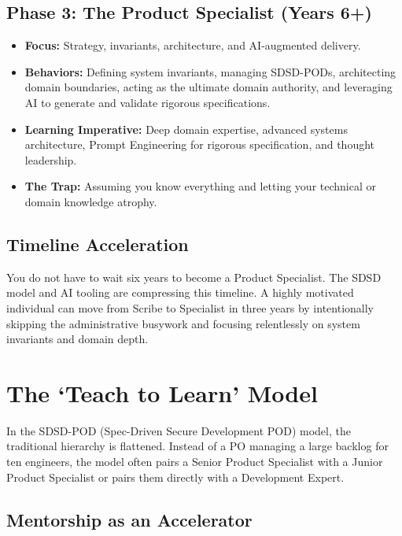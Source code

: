 \documentclass[
  11pt,
  openany,
  oneside]{book}
\providecommand{\tightlist}{%
  \setlength{\itemsep}{0pt}\setlength{\parskip}{0pt}}
\begin{document}
\subsection{Phase 3: The Product Specialist (Years
6+)}\label{phase-3-the-product-specialist-years-6}

\begin{itemize}
\tightlist
\item
  \textbf{Focus:} Strategy, invariants, architecture, and AI-augmented
  delivery.
\item
  \textbf{Behaviors:} Defining system invariants, managing SDSD-PODs,
  architecting domain boundaries, acting as the ultimate domain
  authority, and leveraging AI to generate and validate rigorous
  specifications.
\item
  \textbf{Learning Imperative:} Deep domain expertise, advanced systems
  architecture, Prompt Engineering for rigorous specification, and
  thought leadership.
\item
  \textbf{The Trap:} Assuming you know everything and letting your
  technical or domain knowledge atrophy.
\end{itemize}

\subsection{Timeline Acceleration}\label{timeline-acceleration}

You do not have to wait six years to become a Product Specialist. The
SDSD model and AI tooling are compressing this timeline. A highly
motivated individual can move from Scribe to Specialist in three years
by intentionally skipping the administrative busywork and focusing
relentlessly on system invariants and domain depth.

\bigskip

\section{The `Teach to Learn' Model}\label{the-teach-to-learn-model}

In the SDSD-POD (Spec-Driven Secure Development POD) model, the
traditional hierarchy is flattened. Instead of a PO managing a large
backlog for ten engineers, the model often pairs a Senior Product
Specialist with a Junior Product Specialist or pairs them directly with
a Development Expert.

\subsection{Mentorship as an
Accelerator}\label{mentorship-as-an-accelerator}
\end{document}
